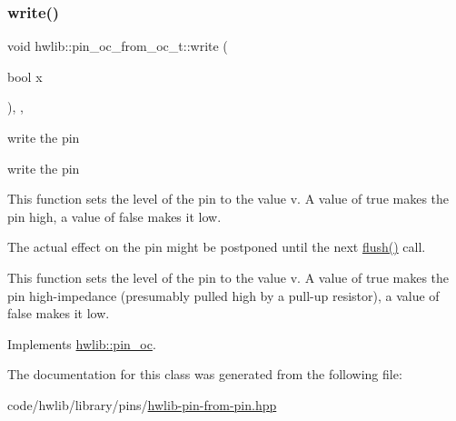 \mbox{\label{classhwlib_1_1pin__oc__from__oc__t_a0ada22e9e4452523de2b89b6b049c10b}} 
\subsubsection{\texorpdfstring{write()}{write()}}
{\footnotesize\ttfamily void hwlib\+::pin\+\_\+oc\+\_\+from\+\_\+oc\+\_\+t\+::write (\begin{DoxyParamCaption}\item[{bool}]{x }\end{DoxyParamCaption})\hspace{0.3cm}{\ttfamily [inline]}, {\ttfamily [override]}, {\ttfamily [virtual]}}





write the pin

write the pin

This function sets the level of the pin to the value v. A value of true makes the pin high, a value of false makes it low.

The actual effect on the pin might be postponed until the next \hyperlink{classhwlib_1_1pin__oc__from__oc__t_a20b667326a27ae3156874fc308d4e795}{flush()} call.

This function sets the level of the pin to the value v. A value of true makes the pin high-\/impedance (presumably pulled high by a pull-\/up resistor), a value of false makes it low. 

Implements \hyperlink{classhwlib_1_1pin__oc_a4429dd7dc80858a213bb157f4ac5def3}{hwlib\+::pin\+\_\+oc}.



The documentation for this class was generated from the following file\+:\begin{DoxyCompactItemize}
\item 
code/hwlib/library/pins/\hyperlink{hwlib-pin-from-pin_8hpp}{hwlib-\/pin-\/from-\/pin.\+hpp}\end{DoxyCompactItemize}
